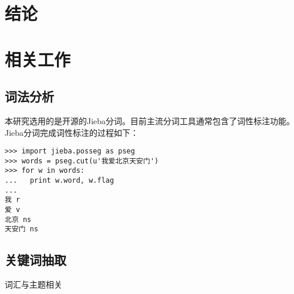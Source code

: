 \section{结论}\label{ux7ed3ux8bba}

\section{相关工作}\label{ux76f8ux5173ux5de5ux4f5c}

\subsection{词法分析}\label{ux8bcdux6cd5ux5206ux6790}

本研究选用的是开源的Jieba分词。目前主流分词工具通常包含了词性标注功能。Jieba分词完成词性标注的过程如下：

\begin{verbatim}
>>> import jieba.posseg as pseg
>>> words = pseg.cut(u'我爱北京天安门')
>>> for w in words:
...   print w.word, w.flag
...
我 r
爱 v
北京 ns
天安门 ns
\end{verbatim}

\subsection{关键词抽取}\label{ux5173ux952eux8bcdux62bdux53d6}

词汇与主题相关
